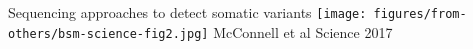 \documentclass{beamer}
\begin{document}
\begin{frame}[label=bsm-methods]{Sequencing approaches to detect somatic variants}
\texttt{[image: figures/from-others/bsm-science-fig2.jpg]}
\vfill
\tiny{McConnell et al Science 2017}
\end{frame}
\end{document}
